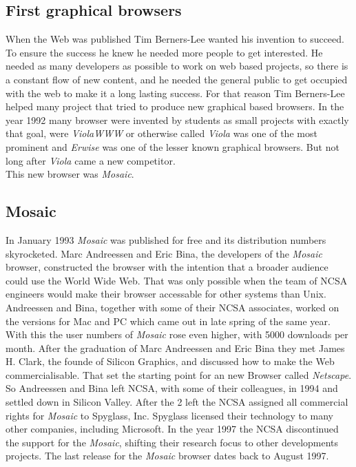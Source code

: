 \documentclass[runningheads]{llncs}
\begin{document}
		\subsection{First graphical browsers}
		When the Web was published Tim Berners-Lee wanted his invention to succeed. To ensure the success he knew he needed more people to get interested. He needed as many developers as possible to work on web based projects, so there is a constant flow of new content, and he needed the general public to get occupied with the web to make it a long lasting success. For that reason Tim Berners-Lee helped many project that tried to produce new graphical based browsers. In the year 1992 many browser were invented by students as small projects with exactly that goal, were \textit{ViolaWWW} or otherwise called \textit{Viola} was one of the most prominent and \textit{Erwise} was one of the lesser known graphical browsers. But not long after \textit{Viola} came a new competitor. \\This new browser was \textit{Mosaic}.
		\subsection{Mosaic}
		In January 1993 \textit{Mosaic} was published for free and its distribution numbers skyrocketed. Marc Andreessen and Eric Bina, the developers of the \textit{Mosaic} browser, constructed the browser with the intention that a broader audience could use the World Wide Web. That was only possible when the team of NCSA engineers would make their browser accessable for other systems than Unix. Andreessen and Bina, together with some of their NCSA associates, worked on the versions for Mac and PC which came out in late spring of the same year. With this the user numbers of \textit{Mosaic} rose even higher, with 5000 downloads per month. After the graduation of Marc Andreessen and Eric Bina they met James H. Clark, the founde of Silicon Graphics, and discussed how to make the Web commercialisable. That set the starting point for an new Browser called \textit{Netscape}. So Andreessen and Bina left NCSA, with some of their colleagues, in 1994 and settled down in Silicon Valley. After the 2 left the NCSA assigned all commercial rights for \textit{Mosaic} to Spyglass, Inc. Spyglass licensed their technology to many other companies, including Microsoft. In the year 1997 the NCSA discontinued the support for the \textit{Mosaic}, shifting their research focus to other developments projects. The last release for the \textit{Mosaic} browser dates back to August 1997.
\end{document}
